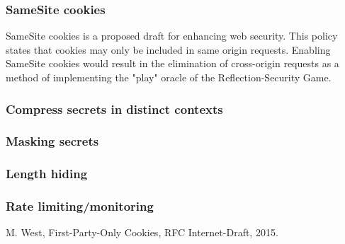 \documentclass{article}
\begin{document}
\subsubsection{SameSite cookies}
SameSite cookies \cite{c1} is a proposed draft for enhancing web security. This policy
states that cookies may only be included in same origin requests. Enabling
SameSite cookies would result in the elimination of cross-origin requests as a
method of implementing the "play" oracle of the Reflection-Security Game.

\subsubsection{Compress secrets in distinct contexts}

\subsubsection{Masking secrets}

\subsubsection{Length hiding}

\subsubsection{Rate limiting/monitoring}

\begin{thebibliography}{1}

 M. West, First-Party-Only Cookies, RFC Internet-Draft, 2015.

\end{thebibliography}
\end{document}
